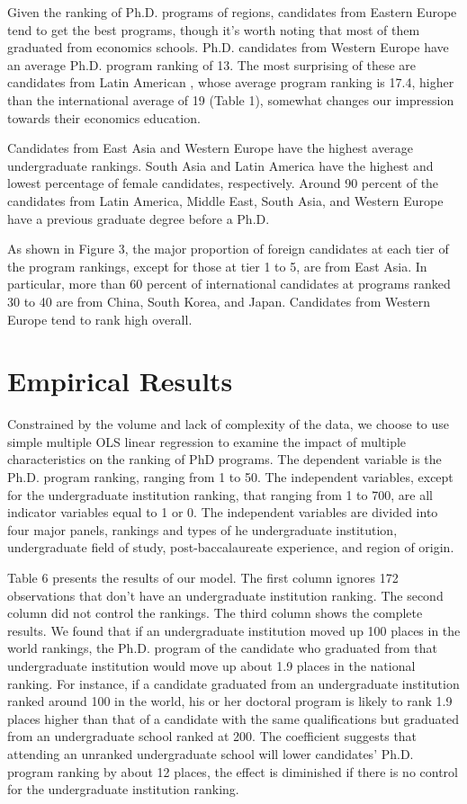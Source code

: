 \documentclass[12pt]{article}
\begin{document}
Given the ranking of Ph.D. programs of regions, candidates from Eastern Europe tend to get the best programs, though it's worth noting that most of them graduated from economics schools. Ph.D. candidates from Western Europe have an average Ph.D. program ranking of 13. The most surprising of these are candidates from Latin American , whose average program ranking is 17.4, higher than the international average of 19 (Table 1), somewhat changes our impression towards their economics education.

Candidates from East Asia and Western Europe have the highest average undergraduate rankings. South Asia and Latin America have the highest and lowest percentage of female candidates, respectively. Around 90 percent of the candidates from Latin America, Middle East, South Asia, and Western Europe have a previous graduate degree before a Ph.D.


As shown in Figure 3, the major proportion of foreign candidates at each tier of the program rankings, except for those at tier 1 to 5, are from East Asia. In particular, more than 60 percent of international candidates at programs ranked 30 to 40 are from China, South Korea, and Japan. Candidates from Western Europe tend to rank high overall.



\clearpage
\section{Empirical Results \label{sec:empircal}}
Constrained by the volume and lack of complexity of the data, we choose to use simple multiple OLS linear regression to examine the impact of multiple characteristics on the ranking of PhD programs. The dependent variable is the Ph.D. program ranking, ranging from 1 to 50. The independent variables, except for the undergraduate institution ranking, that ranging from 1 to 700, are all indicator variables equal to 1 or 0. The independent variables are divided into four major panels, rankings and types of he undergraduate institution, undergraduate field of study, post-baccalaureate experience, and region of origin. 

Table 6 presents the results of our model. The first column ignores 172 observations that don’t have an undergraduate institution ranking. The second column did not control the rankings. The third column shows the complete results. We found that if an undergraduate institution moved up 100 places in the world rankings, the Ph.D. program of the candidate who graduated from that undergraduate institution would move up about 1.9 places in the national ranking. For instance, if a candidate graduated from an undergraduate institution ranked around 100 in the world, his or her doctoral program is likely to rank 1.9 places higher than that of a candidate with the same qualifications but graduated from an undergraduate school ranked at 200. The coefficient suggests that attending an unranked undergraduate school will lower candidates' Ph.D. program ranking by about 12 places, the effect is diminished if there is no control for the undergraduate institution ranking. 
\end{document}
